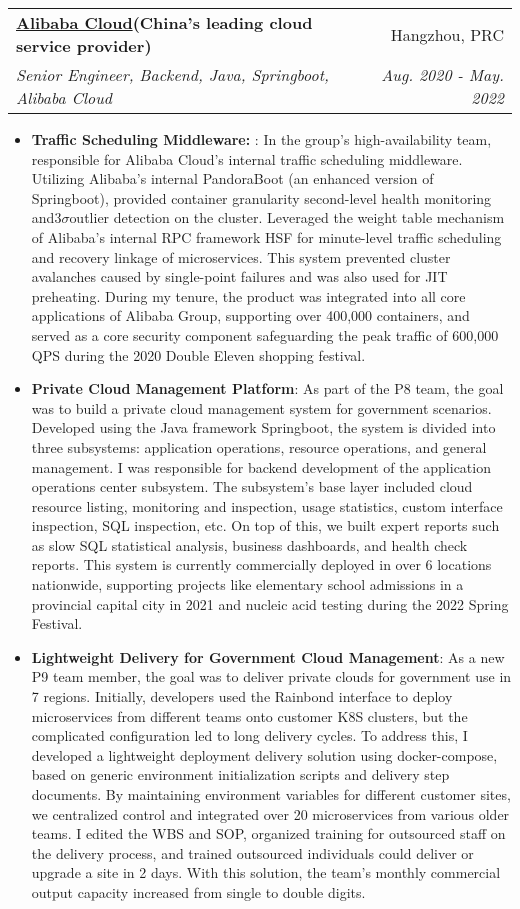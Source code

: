 \documentclass[letterpaper,11pt]{article}
\makeatletter
\newcommand{\resumeItem}[2]{
	\item\small{
		\textbf{#1}{: #2 \vspace{-2pt}}
	}
}
\newcommand{\resumeSubheading}[4]{
	\vspace{-1pt}\item
	\begin{tabular*}{0.97\textwidth}[t]{l@{\extracolsep{\fill}}r}
		\textbf{#1} & #2 \\
		\textit{\small#3} & \textit{\small #4} \\
	\end{tabular*}\vspace{-5pt}
}
\newcommand{\resumeItemListStart}{\begin{itemize}}
\newcommand{\resumeItemListEnd}{\end{itemize}\vspace{-5pt}}
\makeatother
\begin{document}
\begin{spacing}{0.9}
	
	\resumeSubheading
	{\href{https://www.alibabacloud.com/}{Alibaba Cloud}(China's leading cloud service provider)}{Hangzhou, PRC}
	{Senior Engineer, Backend, Java, Springboot, Alibaba Cloud}{Aug. 2020 - May. 2022}
	\resumeItemListStart
	\resumeItem{Traffic Scheduling Middleware: }
	{In the group's high-availability team, responsible for Alibaba Cloud's internal traffic scheduling middleware. Utilizing Alibaba's internal PandoraBoot (an enhanced version of Springboot), provided container granularity second-level health monitoring and$3\sigma$outlier detection on the cluster. Leveraged the weight table mechanism of Alibaba's internal RPC framework HSF for minute-level traffic scheduling and recovery linkage of microservices. This system prevented cluster avalanches caused by single-point failures and was also used for JIT preheating. During my tenure, the product was integrated into all core applications of Alibaba Group, supporting over 400,000 containers, and served as a core security component safeguarding the peak traffic of 600,000 QPS during the 2020 Double Eleven shopping festival.}
	\resumeItem{Private Cloud Management Platform}
	{As part of the P8 team, the goal was to build a private cloud management system for government scenarios. Developed using the Java framework Springboot, the system is divided into three subsystems: application operations, resource operations, and general management. I was responsible for backend development of the application operations center subsystem. The subsystem’s base layer included cloud resource listing, monitoring and inspection, usage statistics, custom interface inspection, SQL inspection, etc. On top of this, we built expert reports such as slow SQL statistical analysis, business dashboards, and health check reports. This system is currently commercially deployed in over 6 locations nationwide, supporting projects like elementary school admissions in a provincial capital city in 2021 and nucleic acid testing during the 2022 Spring Festival.}
	\resumeItem{Lightweight Delivery for Government Cloud Management}
	{As a new P9 team member, the goal was to deliver private clouds for government use in 7 regions. Initially, developers used the Rainbond interface to deploy microservices from different teams onto customer K8S clusters, but the complicated configuration led to long delivery cycles. To address this, I developed a lightweight deployment delivery solution using docker-compose, based on generic environment initialization scripts and delivery step documents. By maintaining environment variables for different customer sites, we centralized control and integrated over 20 microservices from various older teams. I edited the WBS and SOP, organized training for outsourced staff on the delivery process, and trained outsourced individuals could deliver or upgrade a site in 2 days. With this solution, the team’s monthly commercial output capacity increased from single to double digits.}
	\resumeItemListEnd
	

\end{spacing}
\end{document}
